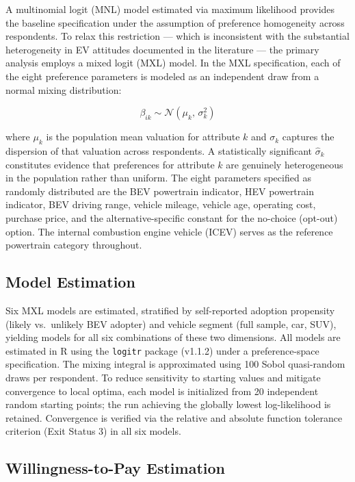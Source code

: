 \documentclass[a4paper,fleqn]{cas-sc}   %
\begin{document}
A multinomial logit (MNL) model estimated via maximum likelihood provides the baseline specification under the assumption of preference homogeneity across respondents. To relax this restriction --- which is inconsistent with the substantial heterogeneity in EV attitudes documented in the literature --- the primary analysis employs a mixed logit (MXL) model. In the MXL specification, each of the eight preference parameters is modeled as an independent draw from a normal mixing distribution:

\begin{equation}
\beta_{ik} \sim \mathcal{N}(\mu_k,\, \sigma_k^2)
\label{eq:mixing}
\end{equation}

\noindent where $\mu_k$ is the population mean valuation for attribute $k$ and $\sigma_k$ captures the dispersion of that valuation across respondents. A statistically significant $\hat{\sigma}_k$ constitutes evidence that preferences for attribute $k$ are genuinely heterogeneous in the population rather than uniform. The eight parameters specified as randomly distributed are the BEV powertrain indicator, HEV powertrain indicator, BEV driving range, vehicle mileage, vehicle age, operating cost, purchase price, and the alternative-specific constant for the no-choice (opt-out) option. The internal combustion engine vehicle (ICEV) serves as the reference powertrain category throughout.

\subsection{Model Estimation}

Six MXL models are estimated, stratified by self-reported adoption propensity (likely vs.\ unlikely BEV adopter) and vehicle segment (full sample, car, SUV), yielding models for all six combinations of these two dimensions. All models are estimated in R using the \texttt{logitr} package (v1.1.2) under a preference-space specification. The mixing integral is approximated using 100 Sobol quasi-random draws per respondent. To reduce sensitivity to starting values and mitigate convergence to local optima, each model is initialized from 20 independent random starting points; the run achieving the globally lowest log-likelihood is retained. Convergence is verified via the relative and absolute function tolerance criterion (Exit Status 3) in all six models.

\subsection{Willingness-to-Pay Estimation}
\end{document}
